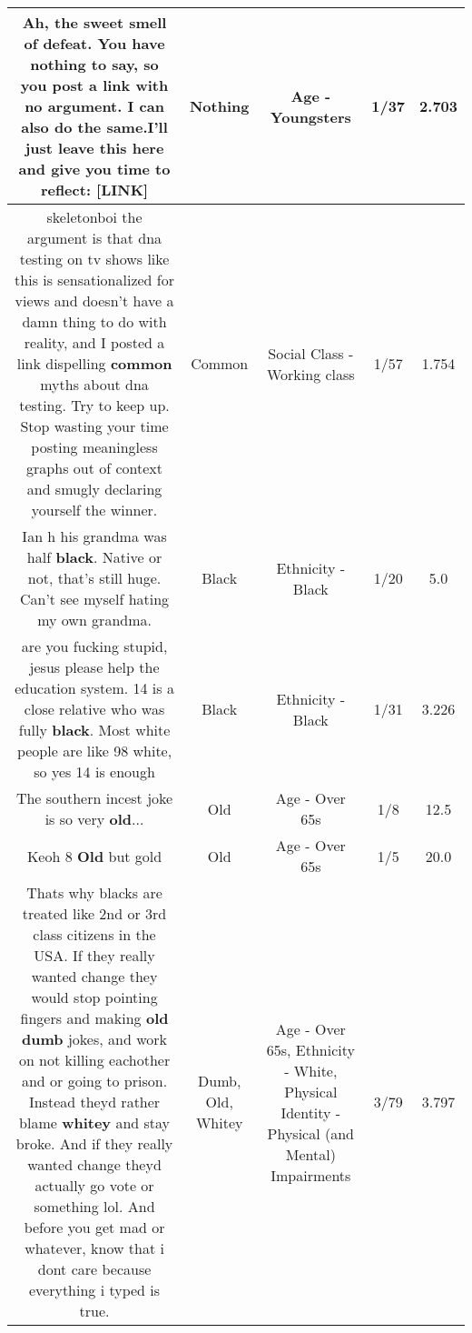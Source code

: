 \documentclass[11pt]{article}
\newlength\mylength
\begin{document}
\begin{center}
\begin{longtable}{|C{.65\mylength}|C{.30\mylength}|C{.12\mylength}|C{.12\mylength}|C{.12\mylength}|}
  \small Ah, the sweet smell of defeat. You have \textbf{nothing} to say, so you post a link with no argument. I can also do the same.I'll just leave this here and give you time to reflect: [LINK] \normalsize   & Nothing & Age - Youngsters & 1/37 & 2.703 \\  \hline
  \small skeletonboi the argument is that dna testing on tv shows like this is sensationalized for views and doesn't have a damn thing to do with reality, and I posted a link dispelling \textbf{common} myths about dna testing. Try to keep up. Stop wasting your time posting meaningless graphs out of context and smugly declaring yourself the winner.\normalsize   & Common & Social Class - Working class & 1/57 & 1.754 \\  \hline
  \small Ian h his grandma was half \textbf{black}. Native or not, that's still huge. Can't see myself hating my own grandma.\normalsize   & Black & Ethnicity - Black & 1/20 & 5.0 \\  \hline
  \small are you fucking stupid, jesus please help the education system. 14 is a close relative who was fully \textbf{black}. Most white people are like 98 white, so yes 14 is enough\normalsize   & Black & Ethnicity - Black & 1/31 & 3.226 \\  \hline
  \small The southern incest joke is so very \textbf{old}...\normalsize   & Old & Age - Over 65s & 1/8 & 12.5 \\  \hline
  \small Keoh 8 \textbf{Old} but gold\normalsize   & Old & Age - Over 65s & 1/5 & 20.0 \\  \hline
  \small Thats why blacks are treated like 2nd or 3rd class citizens in the USA.   If  they really wanted change they would stop pointing fingers and making \textbf{old} \textbf{dumb} jokes, and work on not killing eachother and or going to prison.  Instead theyd rather blame \textbf{whitey} and stay broke.  And if they really wanted change theyd actually go vote or something lol.  And before you get mad or whatever, know that i dont care  because everything i typed is true.\normalsize   & Dumb, Old, Whitey & Age - Over 65s, Ethnicity - White, Physical Identity - Physical (and Mental) Impairments & 3/79 & 3.797 \\  \hline

\end{longtable}
\end{center}
\end{document}

